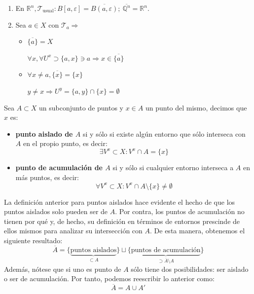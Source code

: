 \begin{ej}
\begin{enumerate}
    \item En $\mathbb{R}^n, \mathcal{T}_{\text{usual}}: B\left[ a, \varepsilon \right] = \overline{B \left( a, \varepsilon \right)};\ \overline{\mathbb{Q}^n} = \mathbb{R}^n$.
    \item Sea $a \in X$ con $\mathcal{T}_a \Rightarrow$
    \begin{itemize}
        \item $\overline{\{a\}} = X $
        \begin{demo}
            $\forall x, \forall U^x \supset \{a, x\} \ni a \Rightarrow x \in \overline{\{a\}}$
        \end{demo}
        \item $\forall x \neq a, \overline{\{x\}} = \{x\}$
        \begin{demo}
            $y \neq x \Rightarrow U^y = \{a, y\} \cap \{x\} = \emptyset$ 
        \end{demo}
    \end{itemize}
\end{enumerate}
\end{ej}

\begin{defi}[Acumulación]    
Sea $A\subset X$ un subconjunto de puntos y $x\in A$ un punto del mismo, decimos que $x$ es:
\begin{itemize}
\item \textbf{punto aislado de $A$} si y sólo si existe algún entorno que sólo interseca con $A$ en el propio punto, es decir:
$$
\exists V^x \subset X : V^x \cap A = \{x\}
$$
\item \textbf{punto de acumulación de $A$} si y sólo si cualquier entorno interseca a $A$ en más puntos, es decir:
$$
\forall V^x \subset X : V^x \cap A \setminus \{x\} \neq \emptyset
$$
\end{itemize}
\end{defi}

\begin{obs}
La definición anterior para puntos aislados hace evidente el hecho de que los puntos aislados solo pueden ser de $A$. Por contra, los puntos de acumulación no tienen por qué y, de hecho, su definición en términos de entornos prescinde de ellos mismos para analizar su intersección con $A$. De esta manera, obtenemos el siguiente resultado:
$$
\overline{A} = \{\underbrace{\text{puntos aislados}}_{\subset A}\} \sqcup \{\underbrace{\text{puntos de acumulación}}_{\supset \overline{A} \setminus A}\}
$$
Además, nótese que si uno es punto de $A$ sólo tiene dos posibilidades: ser aislado o ser de acumulación. Por tanto, podemos reescribir lo anterior como:
$$
\overline{A} = A \cup A'
$$
\end{obs}

